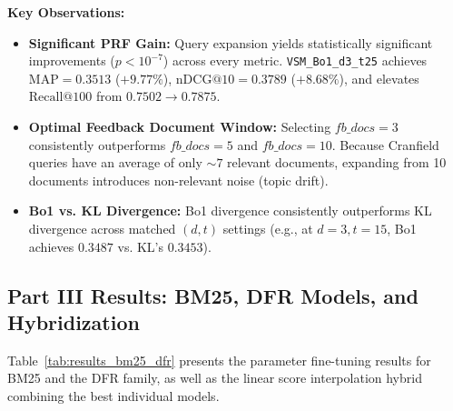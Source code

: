 \documentclass[10pt, a4paper]{article}
\begin{document}
\noindent \textbf{Key Observations:}
\begin{itemize}[noitemsep,topsep=2pt]
    \item \textbf{Significant PRF Gain:} Query expansion yields statistically significant improvements ($p < 10^{-7}$) across every metric. \texttt{VSM\_Bo1\_d3\_t25} achieves $\text{MAP} = \mathbf{0.3513}$ ($+9.77\%$), $\text{nDCG@10} = \mathbf{0.3789}$ ($+8.68\%$), and elevates $\text{Recall@100}$ from $0.7502 \to \mathbf{0.7875}$.
    \item \textbf{Optimal Feedback Document Window:} Selecting $fb\_docs = 3$ consistently outperforms $fb\_docs = 5$ and $fb\_docs = 10$. Because Cranfield queries have an average of only $\sim 7$ relevant documents, expanding from 10 documents introduces non-relevant noise (topic drift).
    \item \textbf{Bo1 vs. KL Divergence:} Bo1 divergence consistently outperforms KL divergence across matched $(d, t)$ settings (e.g., at $d=3, t=15$, Bo1 achieves $0.3487$ vs. KL's $0.3453$).
\end{itemize}

\subsection{Part III Results: BM25, DFR Models, and Hybridization}
\label{sec:results_part3}

Table~\ref{tab:results_bm25_dfr} presents the parameter fine-tuning results for BM25 and the DFR family, as well as the linear score interpolation hybrid combining the best individual models.
\end{document}
